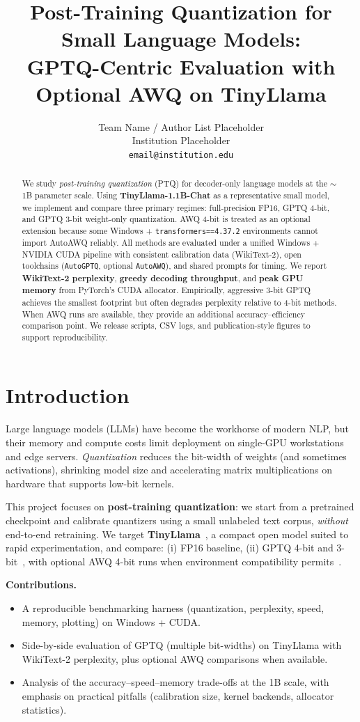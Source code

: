 \documentclass[11pt]{article}
\title{Post-Training Quantization for Small Language Models: \\
  GPTQ-Centric Evaluation with Optional AWQ on TinyLlama}
\author{%
  Team Name / Author List Placeholder\\
  Institution Placeholder\\
  \texttt{email@institution.edu}
}
\begin{document}
\maketitle

\begin{abstract}
We study \emph{post-training quantization} (PTQ) for decoder-only language models at the $\sim$1B parameter scale.
Using \textbf{TinyLlama-1.1B-Chat} as a representative small model, we implement and compare three primary regimes:
full-precision FP16, GPTQ 4-bit, and GPTQ 3-bit weight-only quantization.
AWQ 4-bit is treated as an optional extension because some Windows + \texttt{transformers==4.37.2}
environments cannot import AutoAWQ reliably.
All methods are evaluated under a unified Windows + NVIDIA CUDA pipeline with consistent calibration data (WikiText-2),
open toolchains (\texttt{AutoGPTQ}, optional \texttt{AutoAWQ}), and shared prompts for timing.
We report \textbf{WikiText-2 perplexity}, \textbf{greedy decoding throughput}, and \textbf{peak GPU memory}
from PyTorch's CUDA allocator.
Empirically, aggressive 3-bit GPTQ achieves the smallest footprint but often degrades perplexity relative to 4-bit methods.
When AWQ runs are available, they provide an additional accuracy--efficiency comparison point.
We release scripts, CSV logs, and publication-style figures to support reproducibility.
\end{abstract}

\section{Introduction}
Large language models (LLMs) have become the workhorse of modern NLP, but their memory and compute costs limit
deployment on single-GPU workstations and edge servers.
\emph{Quantization} reduces the bit-width of weights (and sometimes activations), shrinking model size and
accelerating matrix multiplications on hardware that supports low-bit kernels.

This project focuses on \textbf{post-training quantization}: we start from a pretrained checkpoint and calibrate
quantizers using a small unlabeled text corpus, \emph{without} end-to-end retraining.
We target \textbf{TinyLlama}~\citep{zhang2024tinyllama}, a compact open model suited to rapid experimentation,
and compare:
(i) FP16 baseline,
(ii) GPTQ 4-bit and 3-bit~\citep{frantar2023gptq},
with optional AWQ 4-bit runs when environment compatibility permits~\citep{lin2023awq}.

\textbf{Contributions.}
\begin{itemize}
  \item A reproducible benchmarking harness (quantization, perplexity, speed, memory, plotting) on Windows + CUDA.
  \item Side-by-side evaluation of GPTQ (multiple bit-widths) on TinyLlama with WikiText-2 perplexity,
    plus optional AWQ comparisons when available.
  \item Analysis of the accuracy--speed--memory trade-offs at the 1B scale, with emphasis on practical pitfalls
    (calibration size, kernel backends, allocator statistics).
\end{itemize}
\end{document}
